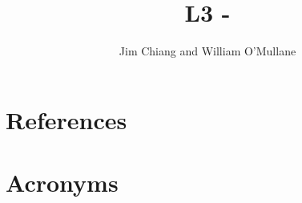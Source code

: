 \documentclass[OPS,authoryear,toc]{lsstdoc}
\title{L3 - \milestone}
\author{%
Jim Chiang and William O'Mullane
}
\date{\vcsDate}
\begin{document}
\maketitle



\appendix
\section{References} \label{sec:bib}
\renewcommand{\refname}{} %


\section{Acronyms} \label{sec:acronyms}

\end{document}
